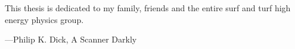 \begin{frontmatter}
\makefrontmatter


\begin{dedication}                                                             
This thesis is dedicated to my family, friends and the entire surf and turf high energy physics group.
\end{dedication}                                                               
\clearpage 


\begin{myepigraph} %
  \vfil                                                                        
  \vfil 
\begin{centering}
\end{centering}
  \vfil 
  \vfil 
  \hfill ---Philip K. Dick, A Scanner Darkly
  \vfil 
\end{myepigraph}                                                               

\tableofcontents
\listoffigures  %
\listoftables   %

\begin{acknowledgements}                                                       
\end{acknowledgements}                                                         


\end{frontmatter}
